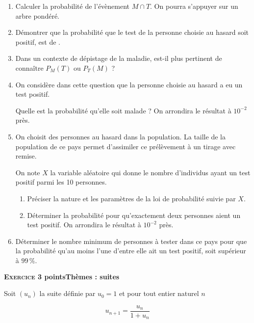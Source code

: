\documentclass[10pt,a4paper]{article}
\begin{document}
\begin{enumerate}
\item Calculer la probabilité de l'évènement $M \cap T$. On pourra s'appuyer sur un arbre pondéré.
\item Démontrer que la probabilité que le test  de la personne choisie au hasard soit positif, est de .
\item Dans un contexte de dépistage de la maladie, est-il plus pertinent de connaître $P_M(T)$ ou $P_T(M)$ ?
\item On considère dans cette question que la personne choisie au hasard a eu un test positif.

Quelle est la probabilité qu'elle soit malade ? On arrondira le résultat à $10^{-2}$ près.
\item On choisit des personnes au hasard dans la population. La taille de la population de ce pays permet d'assimiler ce prélèvement à un tirage avec remise.

On note $X$ la variable aléatoire qui donne le nombre d'individus ayant un test positif parmi les 10 personnes. 
	\begin{enumerate}
		\item Préciser la nature et les paramètres de la loi de probabilité suivie par $X$.
		\item Déterminer la probabilité pour qu'exactement deux personnes aient un test positif. On arrondira le résultat à $10^{-2}$ près.
	\end{enumerate}	
\item Déterminer le nombre minimum de personnes à tester dans ce pays pour que la probabilité qu'au moins l'une d'entre elle ait un test positif, soit supérieur à $99\,\%$.
\end{enumerate}

\bigskip

\textbf{\textsc{Exercice 3}   points\hfill Thèmes : suites}

\medskip

Soit $\left(u_n\right)$ la suite définie par $u_0 = 1$ et pour tout entier naturel $n$

\[u_{n+1} = \dfrac{u_n}{1 + u_n}\]
\end{document}
